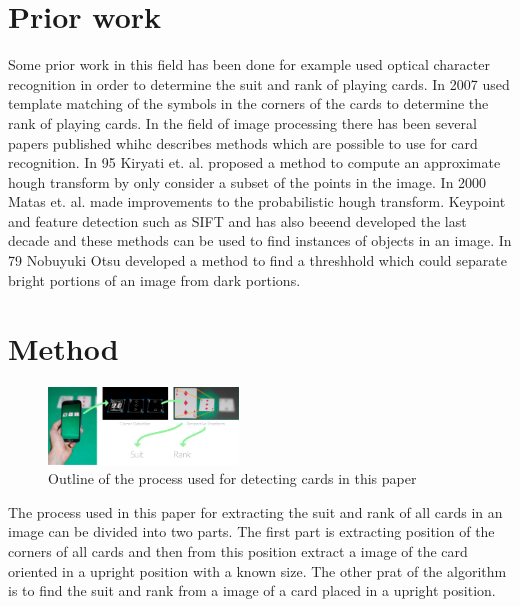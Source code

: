\documentclass[journal,twoside]{IEEEtran}
\begin{document}

\section{Prior work}

Some prior work in this field has been done for example \cite{PokerVision} used optical character recognition in order to determine the  suit and rank of playing cards. In 2007 \cite{CardRec} used template matching of the symbols in the corners of the cards to determine the rank of playing cards.
In the field of image processing there has been several papers published whihc describes methods which are possible to use for card recognition. In 95 Kiryati et. al. proposed a method to compute an approximate hough transform by only consider a subset of the points in the image\cite{HoughProb}. In 2000 Matas et. al. made improvements to the probabilistic hough transform\cite{HoughP}.
Keypoint and feature detection such as SIFT \cite{SIFT} and \cite{ORB} has also beeend developed the last decade and these methods can be used to find instances of objects in an image. In 79 Nobuyuki Otsu developed a method to find a threshhold which could separate bright portions of an image from dark portions\cite{OTSU}.



\section{Method}

\begin{figure}[placement h]
\centering
\includegraphics[width=0.45\textwidth]{images/outline.png}
\caption{Outline of the process used for detecting cards in this paper}
\label{fig:AlgOutline}
\end{figure}

The process used in this paper for extracting the suit and rank of all cards in an image can be divided into two parts. The first part is extracting position of the corners of all cards and then from this position extract a image of the card oriented in a upright position with a known size. The other prat of the algorithm is to find the suit and rank from a image of a card placed in a upright position.
\end{document}
